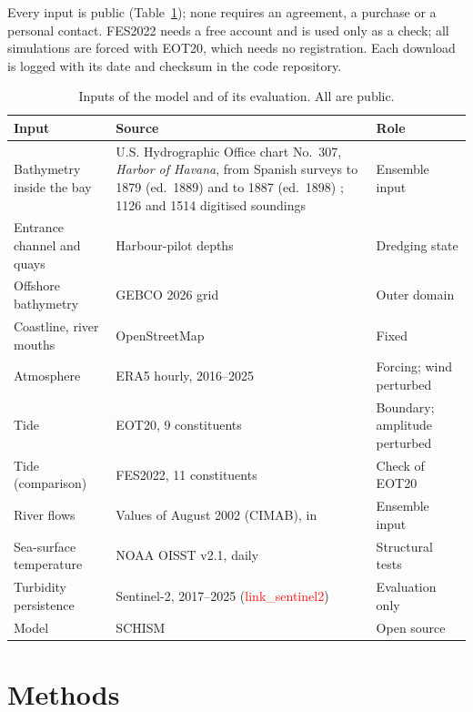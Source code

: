 \documentclass[a4paper,fleqn]{ems-dc}
\newcommand{\ph}[1]{\textcolor{red}{\textsf{#1}}}
\begin{document}
Every input is public (Table~\ref{tab:data}); none requires an agreement, a purchase or a
personal contact. FES2022 needs a free account and is used only as a check; all simulations
are forced with EOT20, which needs no registration. Each download is logged with its date
and checksum in the code repository.

\begin{table}[!t]
\centering\small
\caption{Inputs of the model and of its evaluation. All are public.}\label{tab:data}
\begin{tabular}{p{3.0cm}p{9.8cm}p{4.0cm}}
\toprule
Input & Source & Role\\
\midrule
Bathymetry inside the bay & U.S. Hydrographic Office chart No.~307, \emph{Harbor of
Havana}, from Spanish surveys to 1879 (ed.~1889) and to 1887 (ed.~1898)
\citep{USHO1889,USHO1898}; 1126 and 1514 digitised soundings & Ensemble input\\
Entrance channel and quays & Harbour-pilot depths \citep{Practicos2018} & Dredging state\\
Offshore bathymetry & GEBCO 2026 grid \citep{GEBCO2026} & Outer domain\\
Coastline, river mouths & OpenStreetMap \citep{OSM} & Fixed\\
Atmosphere & ERA5 hourly, 2016--2025 \citep{Hersbach2020} & Forcing; wind perturbed\\
Tide & EOT20, 9 constituents \citep{HartDavis2021} & Boundary; amplitude perturbed\\
Tide (comparison) & FES2022, 11 constituents \citep{FES2022,Lyard2026} & Check of EOT20\\
River flows & Values of August 2002 (CIMAB), in \citet{JICA2004} & Ensemble input\\
Sea-surface temperature & NOAA OISST v2.1, daily \citep{Huang2021} & Structural tests\\
Turbidity persistence & Sentinel-2, 2017--2025 (\ph{link\_sentinel2}) & Evaluation only\\
Model & SCHISM \citep{Zhang2016} & Open source\\
\bottomrule
\end{tabular}
\end{table}

\section{Methods}\label{sec:methods}
\end{document}
